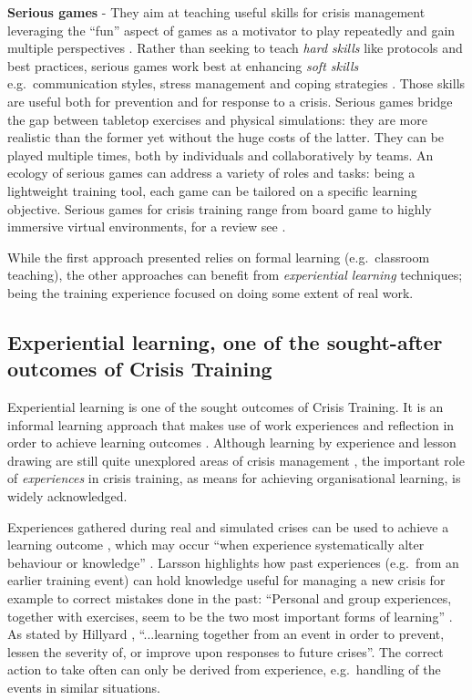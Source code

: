 \textbf{Serious games} - They aim at teaching useful skills for crisis management leveraging the ``fun'' aspect of games as a motivator to play repeatedly and gain multiple perspectives \autocite{DiLoreto:2012bj}. Rather than seeking to teach \emph{hard skills} like protocols and best practices, serious games work best at enhancing \emph{soft skills} e.g.~communication styles, stress management and coping strategies \autocite{Sagun:2009ks}. Those skills are useful both for prevention and for response to a crisis. Serious games bridge the gap between tabletop exercises and physical simulations: they are more realistic than the former yet without the huge costs of the latter. They can be played multiple times, both by individuals and collaboratively by teams. An ecology of serious games can address a variety of roles and tasks: being a lightweight training tool, each game can be tailored on a specific learning objective. Serious games for crisis training range from board game to highly immersive virtual environments, for a review see \autocite{DiLoreto:2012bj}.

While the first approach presented relies on formal learning (e.g.~classroom teaching), the other approaches can benefit from \emph{experiential learning} \autocite{kolb1984organizational} techniques; being the training experience focused on doing some extent of real work.

\subsection[Experiential learning]{Experiential learning, one of the sought-after outcomes of Crisis Training}\label{experiential-learning-one-of-the-sought-after-outcomes-of-crisis-training}

Experiential learning is one of the sought outcomes of Crisis Training. It is an informal learning approach that makes use of work experiences and reflection in order to achieve learning outcomes \autocite{kolb1984organizational}. Although learning by experience and lesson drawing are still quite unexplored areas of crisis management \autocites{Lagadec:1997js}{Boin:2007wt}{Stern:1997eb}, the important role of \emph{experiences} in crisis training, as means for achieving organisational learning, is widely acknowledged.

Experiences gathered during real and simulated crises can be used to achieve a learning outcome \autocite{Deverell:2009fk}, which may occur ``when experience systematically alter behaviour or knowledge'' \autocite[p.233]{Schwab:2007iw}. Larsson \autocite{Larsson:2010jr} highlights how past experiences (e.g.~from an earlier training event) can hold knowledge useful for managing a new crisis for example to correct mistakes done in the past: ``Personal and group experiences, together with exercises, seem to be the two most important forms of learning'' \autocite[p.714]{Larsson:2010jr}. As stated by Hillyard \autocite*{Hillyard:SYlJRQLN}, ``...learning together from an event in order to prevent, lessen the severity of, or improve upon responses to future crises''. The correct action to take often can only be derived from experience, e.g.~handling of the events in similar situations.

